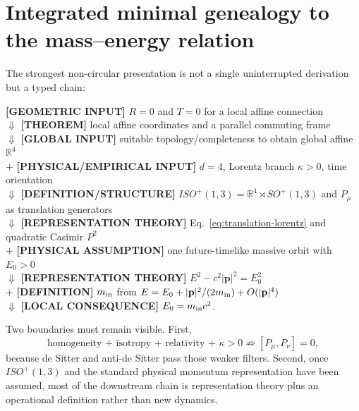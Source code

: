 \documentclass[11pt,a4paper]{article}
\begin{document}
\section{Integrated minimal genealogy to the mass--energy relation}
The strongest non-circular presentation is not a single uninterrupted derivation but a typed chain:
\begin{center}
\begin{minipage}{0.92\linewidth}
\small
\textbf{[GEOMETRIC INPUT]} $R=0$ and $T=0$ for a local affine connection
\\[0.15em]$\Downarrow$ \textbf{[THEOREM]} local affine coordinates and a parallel commuting frame
\\[0.15em]$\Downarrow$ \textbf{[GLOBAL INPUT]} suitable topology/completeness to obtain global affine $\mathbb R^4$
\\[0.15em]$+$ \textbf{[PHYSICAL/EMPIRICAL INPUT]} $d=4$, Lorentz branch $\kappa>0$, time orientation
\\[0.15em]$\Downarrow$ \textbf{[DEFINITION/STRUCTURE]} $ISO^+(1,3)=\mathbb R^4\rtimes SO^+(1,3)$ and $P_\mu$ as translation generators
\\[0.15em]$\Downarrow$ \textbf{[REPRESENTATION THEORY]} Eq.~\eqref{eq:translation-lorentz} and quadratic Casimir $P^2$
\\[0.15em]$+$ \textbf{[PHYSICAL ASSUMPTION]} one future-timelike massive orbit with $E_0>0$
\\[0.15em]$\Downarrow$ \textbf{[REPRESENTATION THEORY]} $E^2-c^2|\mathbf p|^2=E_0^2$
\\[0.15em]$+$ \textbf{[DEFINITION]} $m_{\rm in}$ from $E=E_0+|\mathbf p|^2/(2m_{\rm in})+O(|\mathbf p|^4)$
\\[0.15em]$\Downarrow$ \textbf{[LOCAL CONSEQUENCE]} $E_0=m_{\rm in}c^2$.
\end{minipage}
\end{center}
Two boundaries must remain visible.  First,
\begin{equation}
\boxed{
\text{homogeneity + isotropy + relativity + }\kappa>0
\not\Longrightarrow [P_\mu,P_\nu]=0,}
\end{equation}
because de Sitter and anti-de Sitter pass those weaker filters.  Second, once $ISO^+(1,3)$ and the standard physical momentum representation have been assumed, most of the downstream chain is representation theory plus an operational definition rather than new dynamics.
\end{document}
